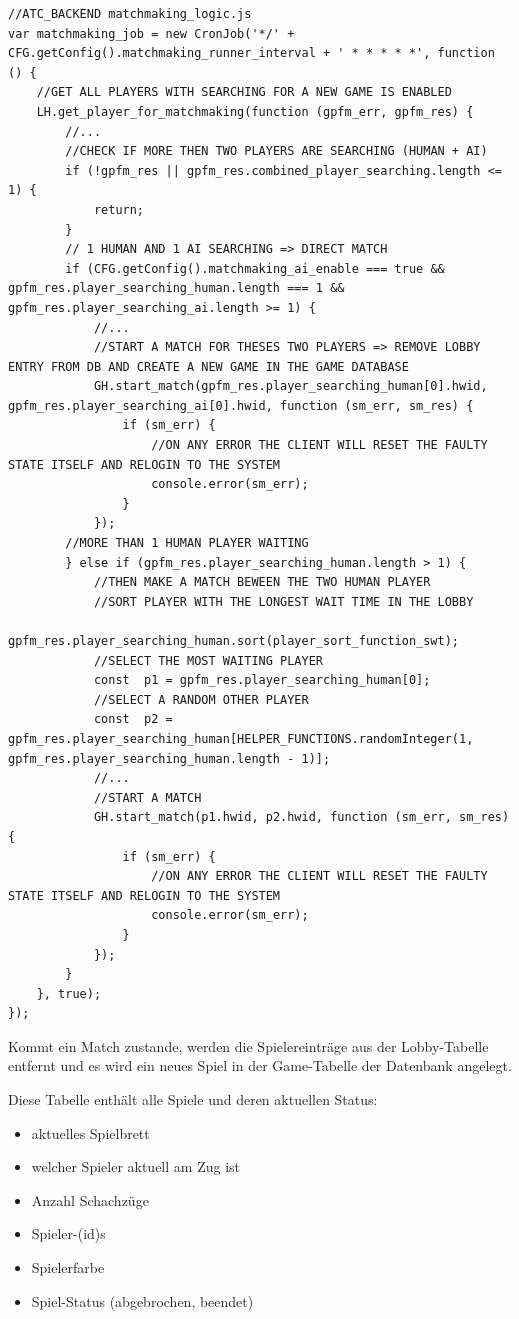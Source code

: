 \begin{lstlisting}
//ATC_BACKEND matchmaking_logic.js
var matchmaking_job = new CronJob('*/' + CFG.getConfig().matchmaking_runner_interval + ' * * * * *', function () {
    //GET ALL PLAYERS WITH SEARCHING FOR A NEW GAME IS ENABLED
    LH.get_player_for_matchmaking(function (gpfm_err, gpfm_res) {
        //...
        //CHECK IF MORE THEN TWO PLAYERS ARE SEARCHING (HUMAN + AI)
        if (!gpfm_res || gpfm_res.combined_player_searching.length <= 1) {
            return;
        }
        // 1 HUMAN AND 1 AI SEARCHING => DIRECT MATCH
        if (CFG.getConfig().matchmaking_ai_enable === true && gpfm_res.player_searching_human.length === 1 && gpfm_res.player_searching_ai.length >= 1) {
            //...
            //START A MATCH FOR THESES TWO PLAYERS => REMOVE LOBBY ENTRY FROM DB AND CREATE A NEW GAME IN THE GAME DATABASE
            GH.start_match(gpfm_res.player_searching_human[0].hwid, gpfm_res.player_searching_ai[0].hwid, function (sm_err, sm_res) {
                if (sm_err) {
                    //ON ANY ERROR THE CLIENT WILL RESET THE FAULTY STATE ITSELF AND RELOGIN TO THE SYSTEM
                    console.error(sm_err);
                }
            });
        //MORE THAN 1 HUMAN PLAYER WAITING
        } else if (gpfm_res.player_searching_human.length > 1) {
            //THEN MAKE A MATCH BEWEEN THE TWO HUMAN PLAYER
            //SORT PLAYER WITH THE LONGEST WAIT TIME IN THE LOBBY
            gpfm_res.player_searching_human.sort(player_sort_function_swt);
            //SELECT THE MOST WAITING PLAYER
            const  p1 = gpfm_res.player_searching_human[0];
            //SELECT A RANDOM OTHER PLAYER
            const  p2 = gpfm_res.player_searching_human[HELPER_FUNCTIONS.randomInteger(1, gpfm_res.player_searching_human.length - 1)];
            //...
            //START A MATCH
            GH.start_match(p1.hwid, p2.hwid, function (sm_err, sm_res) {
                if (sm_err) {
                    //ON ANY ERROR THE CLIENT WILL RESET THE FAULTY STATE ITSELF AND RELOGIN TO THE SYSTEM
                    console.error(sm_err);
                }
            });
        }
    }, true);
});
\end{lstlisting}

Kommt ein Match zustande, werden die Spielereinträge aus der
Lobby-Tabelle entfernt und es wird ein neues Spiel in der Game-Tabelle
der Datenbank angelegt.

Diese Tabelle enthält alle Spiele und deren aktuellen Status:

\begin{itemize}
\tightlist
\item
  aktuelles Spielbrett
\item
  welcher Spieler aktuell am Zug ist
\item
  Anzahl Schachzüge
\item
  Spieler-(id)s
\item
  Spielerfarbe
\item
  Spiel-Status (abgebrochen, beendet)
\end{itemize}

